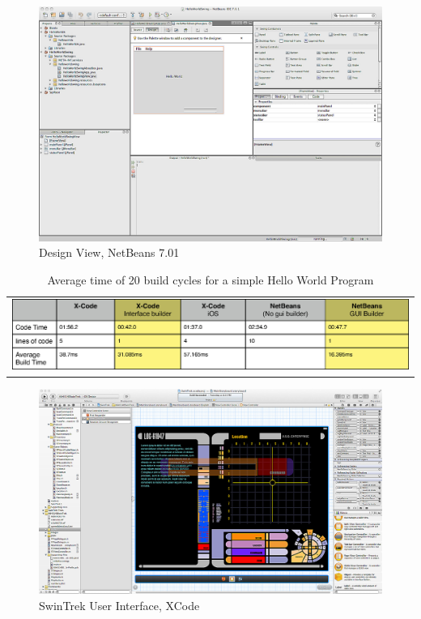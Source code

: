 \documentclass[a4paper,14pt]{article}
\begin{document}
\begin{figure}[H]
\centering
\includegraphics[scale=0.29]{netbeans.eps}
\caption{Design View, NetBeans 7.01}
\label{fig:netbeans}
\end{figure}

\begin{table}[here]
\centering
\begin{tabular}{l}
\includegraphics[scale=0.62]{TableBuildCompares.eps}
\end{tabular}
\caption{Average time of 20 build cycles for a simple Hello World Program}
\label{table:buildTimes}
\end{table}

\begin{figure}[H]
\centering
\includegraphics[scale=0.24]{swintrekuserinterface.eps}
\caption{SwinTrek User Interface, XCode}
\label{fig:swintrekui}
\end{figure}
\end{document}

